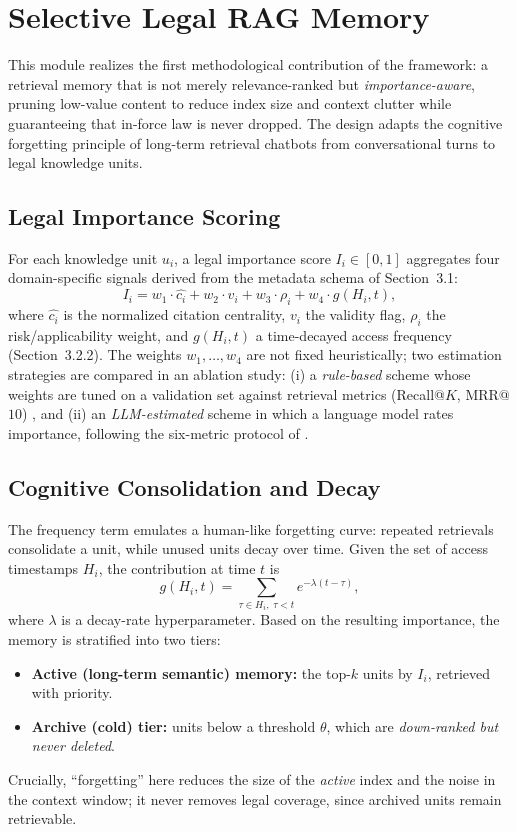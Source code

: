 \section{Selective Legal RAG Memory}
\label{sec:selective}

This module realizes the first methodological contribution of the framework: a retrieval memory that is not merely relevance-ranked but \emph{importance-aware}, pruning low-value content to reduce index size and context clutter while guaranteeing that in-force law is never dropped. The design adapts the cognitive forgetting principle of long-term retrieval chatbots \parencite{Sumida_2025} from conversational turns to legal knowledge units.

\subsection{Legal Importance Scoring}
For each knowledge unit $u_i$, a legal importance score $I_i \in [0,1]$ aggregates four domain-specific signals derived from the metadata schema of Section~3.1:
\begin{equation}
    I_i = w_1 \cdot \widehat{c_i} + w_2 \cdot v_i + w_3 \cdot \rho_i + w_4 \cdot g(H_i, t),
\end{equation}
where $\widehat{c_i}$ is the normalized citation centrality, $v_i$ the validity flag, $\rho_i$ the risk/applicability weight, and $g(H_i,t)$ a time-decayed access frequency (Section~3.2.2). The weights $w_1,\dots,w_4$ are not fixed heuristically; two estimation strategies are compared in an ablation study: (i) a \emph{rule-based} scheme whose weights are tuned on a validation set against retrieval metrics (Recall@$K$, MRR@$10$) \parencite{nguyen2025vlqacomprehensivelargehighquality}, and (ii) an \emph{LLM-estimated} scheme in which a language model rates importance, following the six-metric protocol of \textcite{Sumida_2025}.

\subsection{Cognitive Consolidation and Decay}
The frequency term emulates a human-like forgetting curve: repeated retrievals consolidate a unit, while unused units decay over time. Given the set of access timestamps $H_i$, the contribution at time $t$ is
\begin{equation}
    g(H_i, t) = \sum_{\tau \in H_i,\; \tau < t} e^{-\lambda (t - \tau)},
\end{equation}
where $\lambda$ is a decay-rate hyperparameter. Based on the resulting importance, the memory is stratified into two tiers:
\begin{itemize}
    \item \textbf{Active (long-term semantic) memory:} the top-$k$ units by $I_i$, retrieved with priority.
    \item \textbf{Archive (cold) tier:} units below a threshold $\theta$, which are \emph{down-ranked but never deleted}.
\end{itemize}
Crucially, ``forgetting'' here reduces the size of the \emph{active} index and the noise in the context window; it never removes legal coverage, since archived units remain retrievable.

